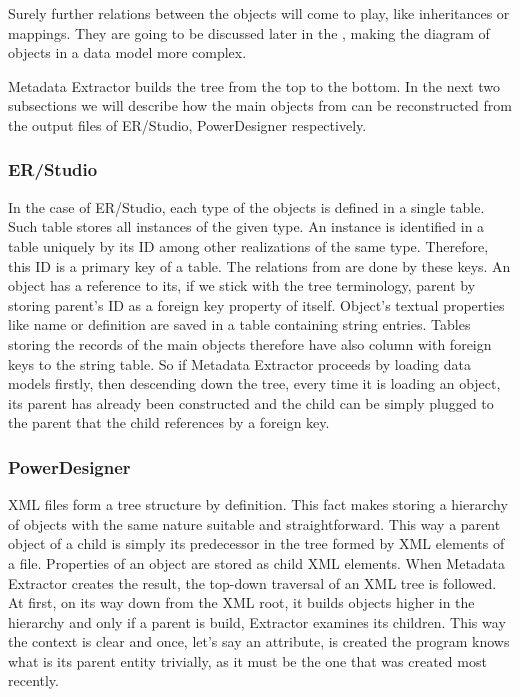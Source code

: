 Surely further relations between the objects will come to play, like inheritances or mappings. They are going to be discussed later in the , making the diagram of objects in a data model more complex.
 
Metadata Extractor builds the tree from the top to the bottom. 
In the next two subsections we will describe how the main objects from  can be reconstructed from the output files of ER/Studio, PowerDesigner respectively.

\subsubsection{ER/Studio}

In the case of ER/Studio, each type of the objects is defined in a single table. Such table stores all instances of the given type. 
An instance is identified in a table uniquely by its ID among other realizations of the same type.
Therefore, this ID is a primary key of a table. The relations from  are 
done by these keys.
An object has a reference to its, if we stick with the tree terminology, parent by storing parent's ID as a foreign key property of itself. 
Object's textual properties like name or definition are saved in a table containing string entries. 
Tables storing the records of the main objects therefore have also column with foreign keys to the string table. 
So if Metadata Extractor proceeds by loading data models firstly, then descending down the tree, every time it is loading an object, its parent has already been constructed and the child can be simply plugged to the parent that the child references by a foreign key.

\subsubsection{PowerDesigner}

XML files form a tree structure by definition. This fact makes storing a hierarchy of objects with the same nature suitable and straightforward. 
This way a parent object of a child is simply its predecessor in the tree formed by XML elements of a file. 
Properties of an object are stored as child XML elements.
When Metadata Extractor creates the result, the top-down traversal of an XML tree is followed. 
At first, on its way down from the XML root, it builds objects higher in the hierarchy and only if a parent is build, Extractor examines its children. 
This way the context is clear and once, let's say an attribute, is created the program knows what is its parent entity trivially, as it must be the one that was created most recently.

